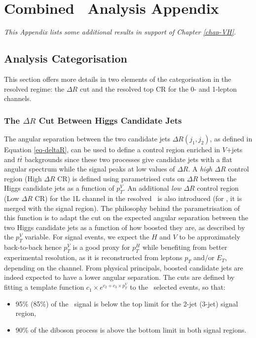 \chapter{Combined \vhbc\ Analysis Appendix}
\ChapFrame

\textit{This Appendix lists some additional results in support of Chapter \ref{chap-VH}.}

%

\section{Analysis Categorisation}\label{ap-vhCat}
This section offers more details in two elements of the categorisation in the resolved regime: the $\Delta R$ cut and the resolved top CR for the 0- and 1-lepton channels.

\subsection{The $\Delta R$ Cut Between Higgs Candidate Jets}\label{ap-sec-vh-deltaR}
The angular separation between the two candidate jets $\Delta R(j_1, j_2)$, as defined in Equation \ref{eq-deltaR}, can be used to define a control region enriched in $V$+jets and $t\bar{t}$ backgrounds since these two processes give candidate jets with a flat angular spectrum while the signal peaks at low values of $\Delta R$. A \textit{high $\Delta R$} control region (High $\Delta R$ CR) is defined using parametrised cuts on $\Delta R$ between the Higgs candidate jets as a function of $p_T^V$. An additional \textit{low $\Delta R$} control region (Low $\Delta R$ CR) for the 1L channel in the resolved \vhb\ is also introduced (for \vhc, it is merged with the signal region). The philosophy behind the parametrisation of this function is to adapt the cut on the expected angular separation between the two Higgs candidate jets as a function of how boosted they are, as described by the $p_T^V$ variable. For signal events, we expect the $H$ and $V$ to be approximately back-to-back hence $p_T^V$ is a good proxy for $p_T^H$ while benefiting from better experimental resolution, as it is reconstructed from leptons $p_T$ and/or $E_T$, depending on the channel. From physical principals, boosted candidate jets are indeed expected to have a lower angular separation. The cuts are defined by fitting a template function $ c_1 \times e^{c_2 + c_3 \times p_T^V}$ to the \vhb\ selected events, so that:   
\begin{itemize}
\item 95\% (85\%) of the \vhb\ signal is below the top limit for the 2-jet (3-jet) signal region,
\item 90\% of the diboson process is above the bottom limit in both signal regions.
\end{itemize}

